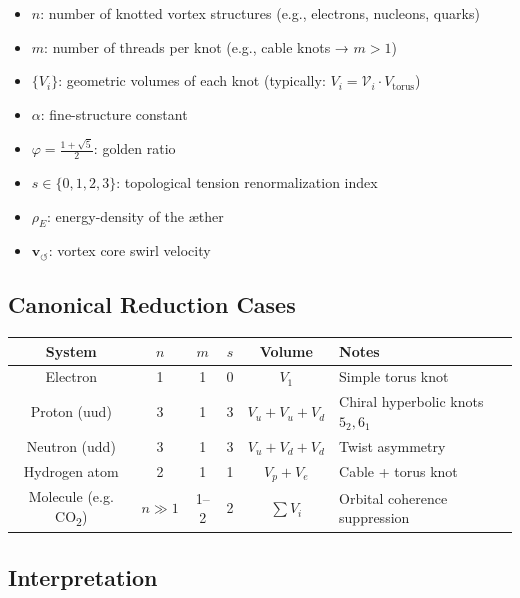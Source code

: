 \documentclass[12pt]{article}
\begin{document}
\begin{itemize}
  \item \( n \): number of knotted vortex structures (e.g., electrons, nucleons, quarks)
  \item \( m \): number of threads per knot (e.g., cable knots → \( m > 1 \))
  \item \( \{V_i\} \): geometric volumes of each knot (typically: \( V_i = \mathcal{V}_i \cdot V_{\text{torus}} \))
  \item \( \alpha \): fine-structure constant
  \item \( \varphi = \frac{1+\sqrt{5}}{2} \): golden ratio
  \item \( s \in \{0, 1, 2, 3\} \): topological tension renormalization index
  \item \( \rho_{\scriptscriptstyle\boldsymbol\!E}\): energy-density of the æther
  \item \( \mathbf{v}_{\scriptscriptstyle\boldsymbol{\circlearrowleft}} \): vortex core swirl velocity
\end{itemize}

\subsection*{Canonical Reduction Cases}

\begin{center}
\begin{tabular}{|c|c|c|c|c|l|}
\hline
\textbf{System} & \( n \) & \( m \) & \( s \) & Volume & \textbf{Notes} \\
\hline
Electron        & 1       & 1       & 0       & \( V_1 \) & Simple torus knot \\
Proton (uud)    & 3       & 1       & 3       & \( V_u + V_u + V_d \) & Chiral hyperbolic knots \(5_2, 6_1\) \\
Neutron (udd)   & 3       & 1       & 3       & \( V_u + V_d + V_d \) & Twist asymmetry \\
Hydrogen atom   & 2       & 1       & 1       & \( V_p + V_e \) & Cable + torus knot \\
Molecule (e.g. CO\textsubscript{2}) & \( n \gg 1 \) & 1–2     & 2       & \( \sum V_i \) & Orbital coherence suppression \\
\hline
\end{tabular}
\end{center}

\subsection*{Interpretation}
\end{document}
